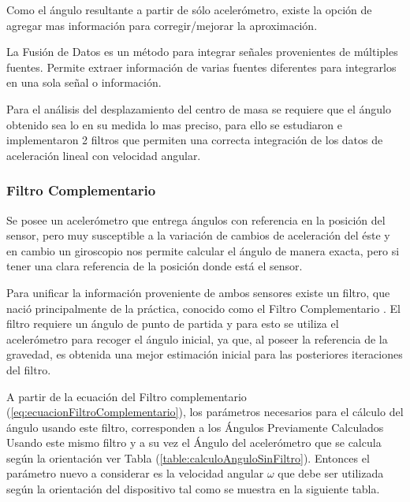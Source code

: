 \documentclass[12pt,a4paper]{article}
\begin{document}
Como el ángulo resultante a partir de sólo acelerómetro, existe la opción de agregar mas información para corregir/mejorar la aproximación.

La Fusión de Datos es un método para integrar señales provenientes de múltiples fuentes. Permite extraer información de varias fuentes diferentes para integrarlos en una sola señal o información.

Para el análisis del desplazamiento del centro de masa se requiere que el ángulo obtenido sea lo en su medida lo mas preciso, para ello se estudiaron e implementaron 2 filtros que permiten una correcta integración de los datos de aceleración lineal con velocidad angular.

\subsubsection{Filtro Complementario}
Se posee un acelerómetro que entrega ángulos con referencia en la posición del sensor, pero muy susceptible a la variación de cambios de aceleración del éste y en cambio un giroscopio nos permite calcular el ángulo de manera exacta, pero si tener una clara referencia de la posición donde está el sensor. 

Para unificar la información proveniente de ambos sensores existe un filtro, que nació principalmente de la práctica, conocido como el Filtro Complementario \cite{TesisUSM}.
El filtro requiere un ángulo de punto de partida y para esto se utiliza el acelerómetro para recoger el ángulo inicial, ya que, al poseer la referencia de la gravedad, es obtenida una mejor estimación inicial para las posteriores iteraciones del filtro.


A partir de la ecuación del Filtro complementario (\ref{eq:ecuacionFiltroComplementario}), los parámetros necesarios para el cálculo del ángulo usando este filtro, corresponden a los Ángulos Previamente Calculados Usando este mismo filtro y a su vez el Ángulo del acelerómetro que se calcula según la orientación ver Tabla (\ref{table:calculoAnguloSinFiltro}).
Entonces el parámetro nuevo a considerar es la velocidad angular $\omega$ que debe ser utilizada según la orientación del dispositivo tal como se muestra en la siguiente tabla.
\end{document}
